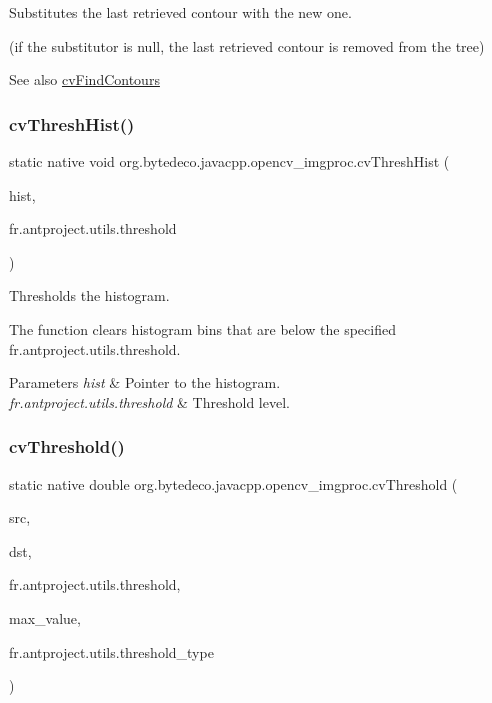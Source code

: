 Substitutes the last retrieved contour with the new one. 

(if the substitutor is null, the last retrieved contour is removed from the tree) \begin{DoxySeeAlso}{See also}
\hyperlink{group__imgproc__c_gaa4cfb26bdebe22cd9a83d79b429520ee}{cv\+Find\+Contours} 
\end{DoxySeeAlso}
\mbox{\label{group__imgproc__c_ga1c1fb991e209c208c788ade579aacc5a}} 
\subsubsection{\texorpdfstring{cv\+Thresh\+Hist()}{cvThreshHist()}}
{\footnotesize\ttfamily static native void org.\+bytedeco.\+javacpp.\+opencv\+\_\+imgproc.\+cv\+Thresh\+Hist (\begin{DoxyParamCaption}\item[{Cv\+Histogram}]{hist,  }\item[{double}]{fr.antproject.utils.threshold }\end{DoxyParamCaption})\hspace{0.3cm}{\ttfamily [static]}}



Thresholds the histogram. 

The function clears histogram bins that are below the specified fr.antproject.utils.threshold.


\begin{DoxyParams}{Parameters}
{\em hist} & Pointer to the histogram. \\
\hline
{\em fr.antproject.utils.threshold} & Threshold level. \\
\hline
\end{DoxyParams}
\mbox{\label{group__imgproc__c_ga41525ded1f96706f6d9368df2a6f044a}} 
\subsubsection{\texorpdfstring{cv\+Threshold()}{cvThreshold()}}
{\footnotesize\ttfamily static native double org.\+bytedeco.\+javacpp.\+opencv\+\_\+imgproc.\+cv\+Threshold (\begin{DoxyParamCaption}\item[{@Const Cv\+Arr}]{src,  }\item[{Cv\+Arr}]{dst,  }\item[{double}]{fr.antproject.utils.threshold,  }\item[{double}]{max\+\_\+value,  }\item[{int}]{fr.antproject.utils.threshold\+\_\+type }\end{DoxyParamCaption})\hspace{0.3cm}{\ttfamily [static]}}



